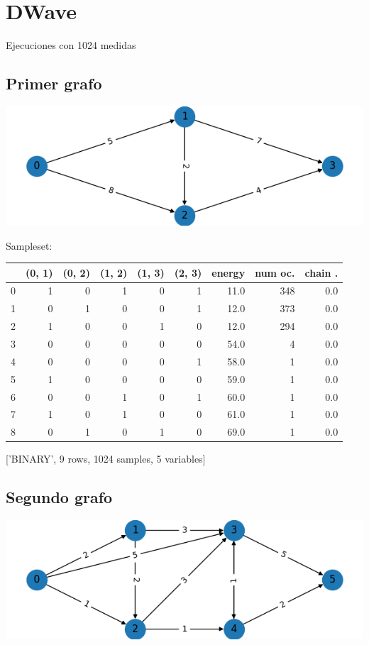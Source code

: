 \documentclass[letterpaper]{article}
\begin{document}
\newpage
\section{DWave}
\label{sec:org358c53d}
Ejecuciones con 1024 medidas
\subsection{Primer grafo}
\label{sec:orge627de2}
\begin{center}
\includegraphics[width=.9\linewidth]{../img/primer_grafo/primer_grafo.png}
\end{center}

Sampleset:
\begin{center}
\begin{tabular}{|r|r|r|r|r|r|r|r|r|}
\hline
 & (0, 1) & (0, 2) & (1, 2) & (1, 3) & (2, 3) & energy & num oc. & chain .\\
\hline
0 & 1 & 0 & 1 & 0 & 1 & 11.0 & 348 & 0.0\\
1 & 0 & 1 & 0 & 0 & 1 & 12.0 & 373 & 0.0\\
2 & 1 & 0 & 0 & 1 & 0 & 12.0 & 294 & 0.0\\
3 & 0 & 0 & 0 & 0 & 0 & 54.0 & 4 & 0.0\\
4 & 0 & 0 & 0 & 0 & 1 & 58.0 & 1 & 0.0\\
5 & 1 & 0 & 0 & 0 & 0 & 59.0 & 1 & 0.0\\
6 & 0 & 0 & 1 & 0 & 1 & 60.0 & 1 & 0.0\\
7 & 1 & 0 & 1 & 0 & 0 & 61.0 & 1 & 0.0\\
8 & 0 & 1 & 0 & 1 & 0 & 69.0 & 1 & 0.0\\
\hline
\end{tabular}
\end{center}
['BINARY', 9 rows, 1024 samples, 5 variables]

\newpage
\subsection{Segundo grafo}
\label{sec:org50493f6}
\begin{center}
\includegraphics[width=.9\linewidth]{../img/segundo_grafo.png}
\end{center}
\end{document}
